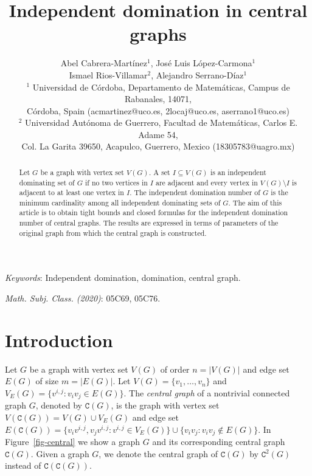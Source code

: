 \documentclass[12pt]{article}
\title{Independent domination in central graphs}
\author{Abel Cabrera-Mart\'inez$^{1}$, Jos\'e Luis L\'opez-Carmona$^{1}$\\[5pt]
Ismael Rios-Villamar$^{2}$, Alejandro Serrano-D\'iaz$^{1}$\\[15pt]
{\small $^{1}$ Universidad de C\'ordoba, Departamento de Matem\'aticas, Campus de Rabanales, 14071,} \\
{\small C\'ordoba, Spain (acmartinez@uco.es, 2locaj@uco.es, aserrano1@uco.es)}\\[7pt]
{\small $^{2}$ Universidad Aut\'onoma de Guerrero,  Facultad de  Matem\'{a}ticas, Carlos E. Adame 54,}\\
{\small  Col. La Garita 39650, Acapulco, Guerrero, Mexico (18305783@uagro.mx)}\\
}
\date{ }
\begin{document}
\maketitle

\begin{abstract}
Let $G$ be a graph with vertex set $V(G)$. A set $I\subseteq V(G)$ is an independent dominating set of $G$ if no two vertices in $I$ are adjacent and every vertex in $V(G)\setminus I$ is adjacent to at least one vertex in $I$. The independent domination number of $G$ is the minimum cardinality among all independent dominating sets of $G$.  The aim of this article is to obtain tight bounds and closed formulas for the independent domination number of central graphs. The results are expressed in terms of parameters of the original graph from which the central graph is constructed. 
\end{abstract}


\noindent
{\it Keywords}: Independent domination, domination, central graph.

\noindent
{\it Math. Subj. Class. (2020)}: 05C69, 05C76.

\section{Introduction}

Let $G$ be a graph with vertex set $V(G)$ of order $n=|V(G)|$ and edge set $E(G)$ of size $m=|E(G)|$. Let $V(G)=\{v_1, \ldots , v_n\}$ and $V_E(G)=\{v^{i,j} : v_iv_j\in E(G)\}$.
The \emph{central graph} of a nontrivial connected graph $G$, denoted by $\mathtt{C}(G)$, is the graph with vertex set  $V(\mathtt{C}(G))=V(G)\cup V_E(G)$ and edge set
$E(\mathtt{C}(G))=\{v_iv^{i,j},v_jv^{i,j}: v^{i,j}\in V_E(G)\}\cup \{v_iv_j: v_iv_j\notin E(G)\}$.
In Figure~\ref{fig-central} we show a graph $G$ and its corresponding central graph~$\mathtt{C}(G)$.
Given a graph $G$, we denote the central graph of $\mathtt{C}(G)$ by $\mathtt{C}^2(G)$ instead of $\mathtt{C}(\mathtt{C}(G))$.
\end{document}
